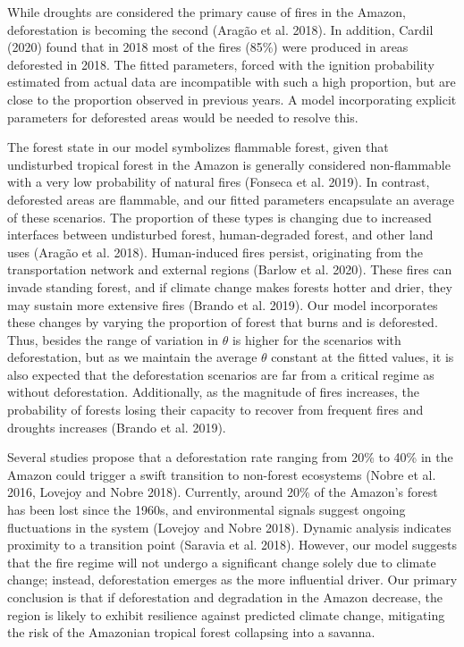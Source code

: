 \documentclass[
]{article}
\begin{document}
While droughts are considered the primary cause of fires in the Amazon,
deforestation is becoming the second (Aragão et al. 2018). In addition,
Cardil (2020) found that in 2018 most of the fires (85\%) were produced
in areas deforested in 2018. The fitted parameters, forced with the
ignition probability estimated from actual data are incompatible with
such a high proportion, but are close to the proportion observed in
previous years. A model incorporating explicit parameters for deforested
areas would be needed to resolve this.

The forest state in our model symbolizes flammable forest, given that
undisturbed tropical forest in the Amazon is generally considered
non-flammable with a very low probability of natural fires (Fonseca et
al. 2019). In contrast, deforested areas are flammable, and our fitted
parameters encapsulate an average of these scenarios. The proportion of
these types is changing due to increased interfaces between undisturbed
forest, human-degraded forest, and other land uses (Aragão et al. 2018).
Human-induced fires persist, originating from the transportation network
and external regions (Barlow et al. 2020). These fires can invade
standing forest, and if climate change makes forests hotter and drier,
they may sustain more extensive fires (Brando et al. 2019). Our model
incorporates these changes by varying the proportion of forest that
burns and is deforested. Thus, besides the range of variation in
\(\theta\) is higher for the scenarios with deforestation, but as we
maintain the average \(\theta\) constant at the fitted values, it is
also expected that the deforestation scenarios are far from a critical
regime as without deforestation. Additionally, as the magnitude of fires
increases, the probability of forests losing their capacity to recover
from frequent fires and droughts increases (Brando et al. 2019).

Several studies propose that a deforestation rate ranging from 20\% to
40\% in the Amazon could trigger a swift transition to non-forest
ecosystems (Nobre et al. 2016, Lovejoy and Nobre 2018). Currently,
around 20\% of the Amazon's forest has been lost since the 1960s, and
environmental signals suggest ongoing fluctuations in the system
(Lovejoy and Nobre 2018). Dynamic analysis indicates proximity to a
transition point (Saravia et al. 2018). However, our model suggests that
the fire regime will not undergo a significant change solely due to
climate change; instead, deforestation emerges as the more influential
driver. Our primary conclusion is that if deforestation and degradation
in the Amazon decrease, the region is likely to exhibit resilience
against predicted climate change, mitigating the risk of the Amazonian
tropical forest collapsing into a savanna.
\end{document}
